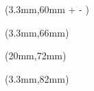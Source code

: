 \documentclass[]{article}
\begin{document}
\raggedright
\color{white}


\newlength{\originalhight}
\newlength{\originallength}
\newlength{\perfecthight}
\setlength{\perfecthight}{12.6737pt}
\newlength{\maxlength}
\setlength{\maxlength}{39mm}
\settoheight{\originalhight}{\settowidth{\originallength}{\noindent \fontsize{18.25}{18.25} \selectfont\textbf{\MakeUppercase{\playername}}}
		\ifdim \originallength > \maxlength
		\resizebox{\maxlength}{!}{\noindent \fontsize{18.25}{18.25} \selectfont\textbf{\MakeUppercase{\playername}}}
		\else
		\noindent \fontsize{18.25}{18.25} \selectfont\textbf{\MakeUppercase{\playername}}
		\fi}

\begin{textblock*}{42mm}(3.3mm,60mm + \perfecthight - \originalhight)
	\settowidth{\originallength}{\noindent \fontsize{18.25}{18.25} \selectfont\textbf{\MakeUppercase{\playername}}}
	\ifdim \originallength > \maxlength
		\resizebox{\maxlength}{!}{\noindent \fontsize{18.25}{18.25} \selectfont\textbf{\MakeUppercase{\playername}}}
	\else
		\noindent \fontsize{18.25}{18.25} \selectfont\textbf{\MakeUppercase{\playername}}
	\fi
\end{textblock*}

\begin{textblock*}{40mm}(3.3mm,66mm)
	\noindent \fontsize{9.8}{9.8} \selectfont \position
\end{textblock*}

\newlength{\maxhight}
\setlength{\maxhight}{5.9mm}
\settoheight{\originalhight}{\parbox{35mm}{
	\fontsize{7.75}{7.75} \selectfont \textit{\textbf{\motto}}}}
\begin{textblock*}{35mm}(20mm,72mm)
	\raggedright
\ifdim \originalhight > \maxhight%
	\begin{fitbox}{35mm}{\maxhight}\raggedright
		\selectfont \textit{\textbf{\motto}}
	\end{fitbox}
\else%
	\raggedright\parbox{35mm}{\raggedright\fontsize{7.75}{7.75} \selectfont \textit{\textbf{\motto}}}
\fi%
\end{textblock*}

\begin{textblock*}{39mm}(3.3mm,82mm)
	\noindent \fontsize{8}{8} \selectfont\textbf{\function}
\end{textblock*}
\end{document}
